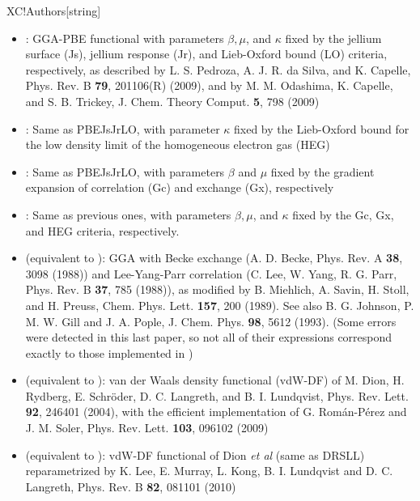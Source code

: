 \begin{fdfentry}{XC!Authors}[string]
\begin{itemize}
    \item%
    : %
    GGA-PBE functional with parameters $\beta, \mu$, and $\kappa$ fixed by 
    the jellium surface (Js), jellium response (Jr), 
    and Lieb-Oxford bound (LO) criteria, respectively, as described by 
    L. S. Pedroza, A. J. R. da Silva, and K. Capelle, 
    Phys. Rev. B \textbf{79}, 201106(R) (2009), and by 
    M. M. Odashima, K. Capelle, and S. B. Trickey, 
    J. Chem. Theory Comput. \textbf{5}, 798 (2009)

    \item%
    : %
    Same as PBEJsJrLO, with parameter $\kappa$ fixed by the  Lieb-Oxford bound 
    for the low density limit of the homogeneous electron gas (HEG)

    \item%
    : %
    Same as PBEJsJrLO, with parameters $\beta$ and $\mu$ fixed by the 
    gradient expansion of correlation (Gc) and exchange (Gx), respectively
    
    \item%
    : %
    Same as previous ones, with parameters $\beta,\mu$, and $\kappa$ fixed by 
    the Gc, Gx, and HEG criteria, respectively.

    \item%
     (equivalent to ): %
    GGA with Becke exchange (A. D. Becke, Phys. Rev. A \textbf{38}, 3098 (1988)) 
    and Lee-Yang-Parr correlation 
    (C. Lee, W. Yang, R. G. Parr, Phys. Rev. B \textbf{37}, 785 (1988)), 
    as modified by B. Miehlich, A. Savin, H. Stoll, and H. Preuss,
    Chem. Phys. Lett. \textbf{157}, 200 (1989). 
    See also B. G. Johnson, P. M. W. Gill and J. A. Pople,
    J. Chem. Phys. \textbf{98}, 5612 (1993). (Some errors were detected in this
    last paper, so not all of their expressions correspond exactly to those
    implemented in \siesta)

    \item%
     (equivalent to ): 
    van der Waals  density functional (vdW-DF) 
    of M. Dion, H. Rydberg, E. Schr\"{o}der, D. C. Langreth, and B. I. Lundqvist,
    Phys. Rev. Lett. \textbf{92}, 246401 (2004), with the efficient implementation of 
    G. Rom\'an-P\'erez and J. M. Soler, Phys. Rev. Lett. \textbf{103},  096102 (2009)
    
    \item%
     (equivalent to ):  %
    vdW-DF functional of Dion \textit{et al} (same as DRSLL)
    reparametrized by K. Lee, E. Murray, L. Kong, B. I. Lundqvist and 
    D. C. Langreth, Phys. Rev. B \textbf{82}, 081101 (2010)


\end{itemize}
\end{fdfentry}
